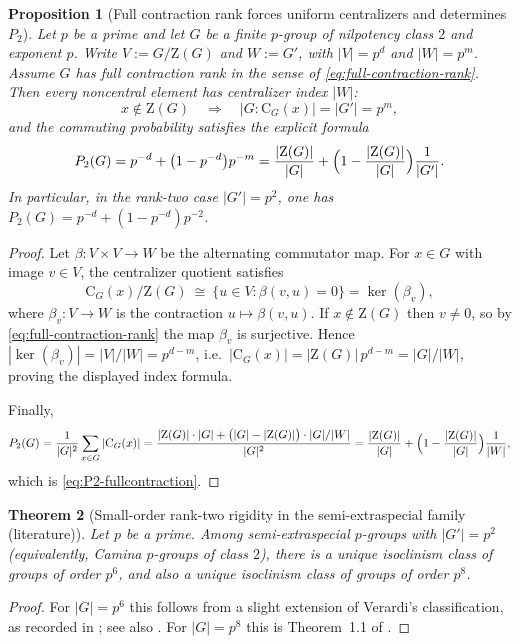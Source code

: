 \documentclass[11pt]{article}
\newtheorem{theorem}{Theorem}[section]
\newtheorem{proposition}[theorem]{Proposition}
\theoremstyle{definition}
\theoremstyle{remark}
\theoremstyle{definition}
\theoremstyle{plain}
\newcommand{\Z}{\mathrm{Z}}
\newcommand{\C}{\mathrm{C}}
\begin{document}
\begin{proposition}[Full contraction rank forces uniform centralizers and determines $P_2$]\label{prop:fullcontraction-P2}
Let $p$ be a prime and let $G$ be a finite $p$-group of nilpotency class $2$ and exponent $p$.
Write $V:=G/\Z(G)$ and $W:=G'$, with $|V|=p^d$ and $|W|=p^m$.
Assume $G$ has full contraction rank in the sense of \eqref{eq:full-contraction-rank}.
Then every noncentral element has centralizer index $|W|$:
\[
x\notin \Z(G)\quad\Longrightarrow\quad |G:\C_G(x)|=|G'|=p^m,
\]
and the commuting probability satisfies the explicit formula
\begin{equation}\label{eq:P2-fullcontraction}
P_2(G)=p^{-d}+\bigl(1-p^{-d}\bigr)p^{-m}
=\frac{|\Z(G)|}{|G|}+\Bigl(1-\frac{|\Z(G)|}{|G|}\Bigr)\frac{1}{|G'|}.
\end{equation}
In particular, in the rank-two case $|G'|=p^2$, one has $P_2(G)=p^{-d}+(1-p^{-d})p^{-2}$.
\end{proposition}

\begin{proof}
Let $\beta:V\times V\to W$ be the alternating commutator map.
For $x\in G$ with image $v\in V$, the centralizer quotient satisfies
\[
\C_G(x)/\Z(G)\ \cong\ \{u\in V:\beta(v,u)=0\}=\ker(\beta_v),
\]
where $\beta_v:V\to W$ is the contraction $u\mapsto\beta(v,u)$.
If $x\notin\Z(G)$ then $v\neq0$, so by \eqref{eq:full-contraction-rank} the map $\beta_v$ is surjective.
Hence $|\ker(\beta_v)|=|V|/|W|=p^{d-m}$, i.e.\ $|\C_G(x)|=|\Z(G)|\,p^{d-m}=|G|/|W|$, proving the displayed index formula.

Finally,
\[
P_2(G)=\frac{1}{|G|^2}\sum_{x\in G}|\C_G(x)|
=\frac{|\Z(G)|\cdot |G|+\bigl(|G|-|\Z(G)|\bigr)\cdot |G|/|W|}{|G|^2}
=\frac{|\Z(G)|}{|G|}+\Bigl(1-\frac{|\Z(G)|}{|G|}\Bigr)\frac{1}{|W|},
\]
which is \eqref{eq:P2-fullcontraction}.
\end{proof}

\begin{theorem}[Small-order rank-two rigidity in the semi-extraspecial family (literature)]\label{thm:ses-rank2-smallorders}
Let $p$ be a prime.  Among semi-extraspecial $p$-groups with $|G'|=p^2$ (equivalently, Camina $p$-groups of class $2$),
there is a \emph{unique} isoclinism class of groups of order $p^6$, and also a unique isoclinism class of groups of order $p^8$.
\end{theorem}

\begin{proof}
For $|G|=p^6$ this follows from a slight extension of Verardi's classification, as recorded in
\cite[\S1]{LewisMaglione2018}; see also \cite[Lemma~5.19]{Yadav2005}.
For $|G|=p^8$ this is Theorem~1.1 of \cite{LewisMaglione2018}.
\end{proof}
\end{document}
